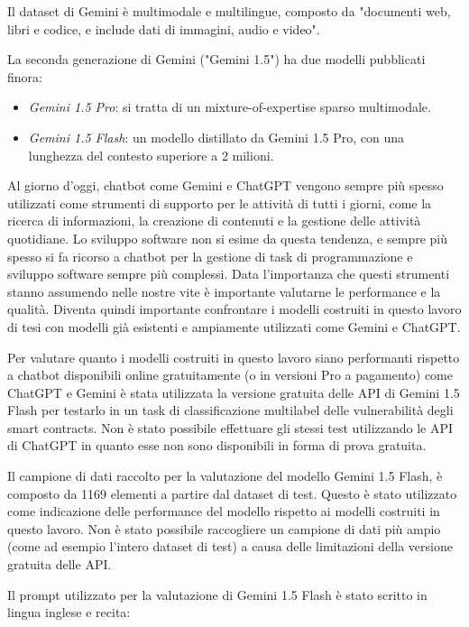 \documentclass[../../Thesis.tex]{subfiles}
\begin{document}
Il dataset di Gemini è multimodale e multilingue, composto da "documenti web, libri e codice, e include dati di immagini, audio e video".

La seconda generazione di Gemini ("Gemini 1.5") ha due modelli pubblicati finora:
\begin{itemize}
    \item \emph{Gemini 1.5 Pro}: si tratta di un mixture-of-expertise sparso multimodale.
    \item \emph{Gemini 1.5 Flash}: un modello distillato da Gemini 1.5 Pro, con una lunghezza del contesto superiore a 2 milioni.
\end{itemize}
Al giorno d'oggi, chatbot come Gemini e ChatGPT vengono sempre più spesso utilizzati come strumenti di supporto per le attività di tutti i giorni, come la ricerca di informazioni, la creazione di contenuti e la gestione delle attività quotidiane. Lo sviluppo software non si esime da questa tendenza, e sempre più spesso si fa ricorso a chatbot per la gestione di task di programmazione e sviluppo software sempre più complessi. Data l'importanza che questi strumenti stanno assumendo nelle nostre vite è importante valutarne le performance e la qualità. Diventa quindi importante confrontare i modelli costruiti in questo lavoro di tesi con modelli già esistenti e ampiamente utilizzati come Gemini e ChatGPT.

Per valutare quanto i modelli costruiti in questo lavoro siano performanti rispetto a chatbot disponibili online gratuitamente (o in versioni Pro a pagamento) come ChatGPT e Gemini è stata utilizzata la versione gratuita delle API di Gemini 1.5 Flash per testarlo in un task di classificazione multilabel delle vulnerabilità degli smart contracts. Non è stato possibile effettuare gli stessi test utilizzando le API di ChatGPT in quanto esse non sono disponibili in forma di prova gratuita.

Il campione di dati raccolto per la valutazione del modello Gemini 1.5 Flash, è composto da 1169 elementi a  partire dal dataset di test. Questo è stato utilizzato come indicazione delle performance del modello rispetto ai modelli costruiti in questo lavoro. Non è stato possibile raccogliere un campione di dati più ampio (come ad esempio l'intero dataset di test) a causa delle limitazioni della versione gratuita delle API. 

Il prompt utilizzato per la valutazione di Gemini 1.5 Flash è stato scritto in lingua inglese e recita: 
\end{document}

